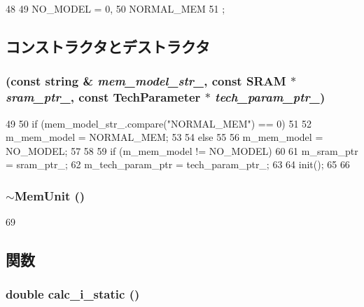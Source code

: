 \begin{DoxyCode}
48     {
49       NO_MODEL = 0,
50       NORMAL_MEM
51     };
\end{DoxyCode}


\subsection{コンストラクタとデストラクタ}
\hypertarget{classMemUnit_af6352207cf5ddd935911e4c95b79b0d5}{
\subsubsection[{MemUnit}]{ (const string \& {\em mem\_\-model\_\-str\_\-}, \/  const {\bf SRAM} $\ast$ {\em sram\_\-ptr\_\-}, \/  const {\bf TechParameter} $\ast$ {\em tech\_\-param\_\-ptr\_\-})}}
\label{classMemUnit_af6352207cf5ddd935911e4c95b79b0d5}



\begin{DoxyCode}
49 {
50     if (mem_model_str_.compare("NORMAL_MEM") == 0)
51     {
52         m_mem_model = NORMAL_MEM;
53     }
54     else 
55     {
56         m_mem_model = NO_MODEL;
57     }
58 
59     if (m_mem_model != NO_MODEL)
60     {
61         m_sram_ptr = sram_ptr_;
62         m_tech_param_ptr = tech_param_ptr_;
63 
64         init();
65     }
66 }
\end{DoxyCode}
\hypertarget{classMemUnit_a7fd2ab7379a545c1aceed773db138327}{
\subsubsection[{$\sim$MemUnit}]{\setlength{\rightskip}{0pt plus 5cm}$\sim${\bf MemUnit} ()}}
\label{classMemUnit_a7fd2ab7379a545c1aceed773db138327}



\begin{DoxyCode}
69 {}
\end{DoxyCode}


\subsection{関数}
\hypertarget{classMemUnit_a0027807356ac4ca07fe2e593234eb884}{
\subsubsection[{calc\_\-i\_\-static}]{\setlength{\rightskip}{0pt plus 5cm}double calc\_\-i\_\-static ()}}
\label{classMemUnit_a0027807356ac4ca07fe2e593234eb884}



